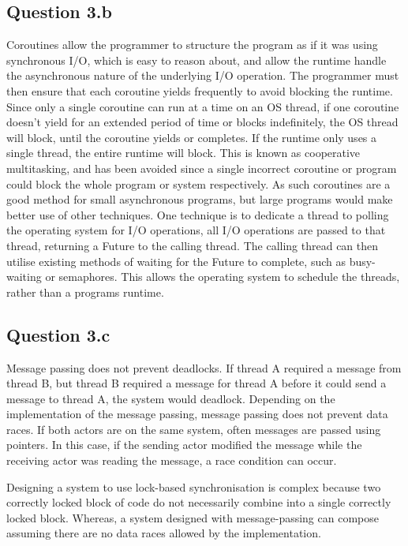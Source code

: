\documentclass[]{article}
\begin{document}
\subsection{Question 3.b}
Coroutines allow the programmer to structure the program as if it was using
synchronous I/O, which is easy to reason about, and allow the runtime handle
the asynchronous nature of the underlying I/O operation.
The programmer must then ensure that each coroutine yields frequently to avoid
blocking the runtime.
Since only a single coroutine can run at a time on an OS thread, if one
coroutine doesn't yield for an extended period of time or blocks indefinitely,
the OS thread will block, until the coroutine yields or completes.
If the runtime only uses a single thread, the entire runtime will block.
This is known as cooperative multitasking, and has been avoided since a single
incorrect coroutine or program could block the whole program or system
respectively.
As such coroutines are a good method for small asynchronous programs, but large
programs would make better use of other techniques.
One technique is to dedicate a thread to polling the operating system for I/O
operations, all I/O operations are passed to that thread, returning a Future to
the calling thread.
The calling thread can then utilise existing methods of waiting for the Future
to complete, such as busy-waiting or semaphores.
This allows the operating system to schedule the threads, rather than a
programs runtime.

\subsection{Question 3.c}
Message passing does not prevent deadlocks.
If thread A required a message from thread B, but thread B required a message
for thread A before it could send a message to thread A, the system would
deadlock.
Depending on the implementation of the message passing, message passing does
not prevent data races.
If both actors are on the same system, often messages are passed using pointers.
In this case, if the sending actor modified the message while the receiving
actor was reading the message, a race condition can occur.

Designing a system to use lock-based synchronisation is complex because two
correctly locked block of code do not necessarily combine into a single
correctly locked block.
Whereas, a system designed with message-passing can compose assuming there are
no data races allowed by the implementation.
\end{document}
